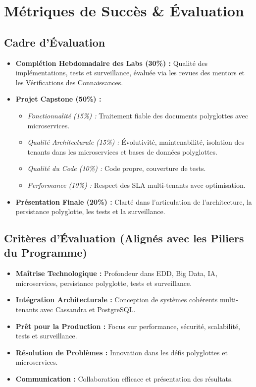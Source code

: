 \documentclass[11pt]{article}
\begin{document}
\section{Métriques de Succès \& Évaluation}

\subsection{Cadre d'Évaluation}
\begin{itemize}
    \item \textbf{Complétion Hebdomadaire des Labs (30\%) :} Qualité des implémentations, tests et surveillance, évaluée via les revues des mentors et les Vérifications des Connaissances.
    \item \textbf{Projet Capstone (50\%) :}
        \begin{itemize}
            \item \textit{Fonctionnalité (15\%) :} Traitement fiable des documents polyglottes avec microservices.
            \item \textit{Qualité Architecturale (15\%) :} Évolutivité, maintenabilité, isolation des tenants dans les microservices et bases de données polyglottes.
            \item \textit{Qualité du Code (10\%) :} Code propre, couverture de tests.
            \item \textit{Performance (10\%) :} Respect des SLA multi-tenants avec optimisation.
        \end{itemize}
    \item \textbf{Présentation Finale (20\%) :} Clarté dans l'articulation de l'architecture, la persistance polyglotte, les tests et la surveillance.
\end{itemize}

\subsection{Critères d'Évaluation (Alignés avec les Piliers du Programme)}
\begin{itemize}
    \item \textbf{Maîtrise Technologique :} Profondeur dans EDD, Big Data, IA, microservices, persistance polyglotte, tests et surveillance.
    \item \textbf{Intégration Architecturale :} Conception de systèmes cohérents multi-tenants avec Cassandra et PostgreSQL.
    \item \textbf{Prêt pour la Production :} Focus sur performance, sécurité, scalabilité, tests et surveillance.
    \item \textbf{Résolution de Problèmes :} Innovation dans les défis polyglottes et microservices.
    \item \textbf{Communication :} Collaboration efficace et présentation des résultats.
\end{itemize}
\end{document}
